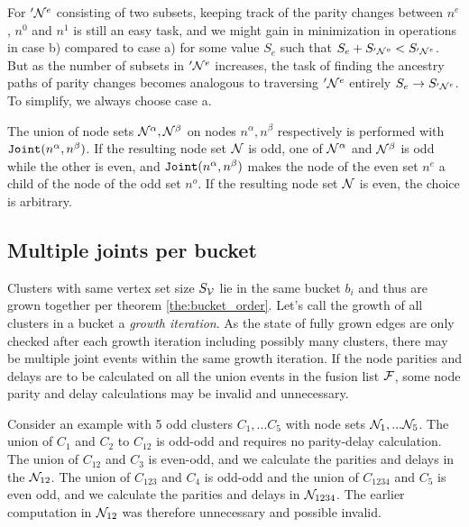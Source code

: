 For $'\mathcal{N}^e$ consisting of two subsets, keeping track of the parity changes between $n^e$, $n^0$ and $n^1$ is still an easy task, and we might gain in minimization in operations in case b) compared to case a) for some value $S_e$ such that $S_e + S_{'\mathcal{N}^o} < S_{'\mathcal{N}^e}$. But as the number of subsets in $'\mathcal{N}^e$ increases, the task of finding the ancestry paths of parity changes becomes analogous to traversing $'\mathcal{N}^e$ entirely $S_e \rightarrow S_{'\mathcal{N}^e}$. To simplify, we always choose case a.

\begin{theorem}\label{the:nodejoint}
  The union of node sets $\mathcal{N}^\alpha, \mathcal{N}^\beta$ on nodes $n^\alpha, n^\beta$ respectively is performed with $\texttt{Joint}(n^\alpha, n^\beta)$. If the resulting node set $\mathcal{N}$ is odd, one of $\mathcal{N}^\alpha$ and $ \mathcal{N}^\beta$ is odd while the other is even, and $\texttt{Joint}(n^\alpha, n^\beta)$ makes the node of the even set $n^e$ a child of the node of the odd set $n^o$. If the resulting node set $\mathcal{N}$ is even, the choice is arbitrary.
\end{theorem}



\subsection{Multiple joints per bucket}

Clusters with same vertex set size $S_{\mathcal{V}}$ lie in the same bucket $b_i$ and thus are grown together per theorem \ref{the:bucket_order}. Let's call the growth of all clusters in a bucket a \emph{growth iteration}. As the state of fully grown edges are only checked after each growth iteration including possibly many clusters, there may be multiple joint events within the same growth iteration. If the node parities and delays are to be calculated on all the union events in the fusion list $\mathcal{F}$, some node parity and delay calculations may be invalid and unnecessary.

Consider an example with 5 odd clusters $C_1, ... C_5$ with node sets $\mathcal{N}_1, ... \mathcal{N}_5$. The union of $C_1$ and $C_2$ to $C_{12}$ is odd-odd and requires no parity-delay calculation. The union of $C_{12}$ and $C_3$ is even-odd, and we calculate the parities and delays in the $\mathcal{N}_{12}$. The union of $C_{123}$ and $C_4$ is odd-odd and the union of $C_{1234}$ and $C_5$ is even odd, and we calculate the parities and delays in $\mathcal{N}_{1234}$. The earlier computation in $\mathcal{N}_{12}$ was therefore unnecessary and possible invalid.

